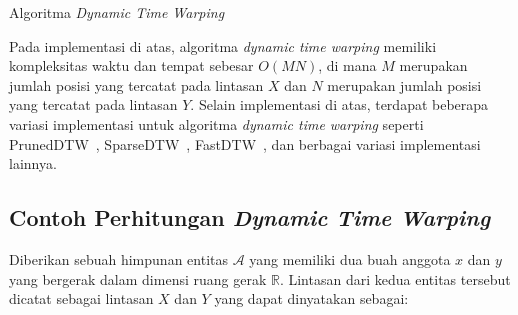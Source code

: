 \begin{algorithm}[h]
    \caption{Algoritma \textit{Dynamic Time Warping}}
    \DontPrintSemicolon
    
    \label{bab2:dtw-pseudocode}
 
  
    
\end{algorithm}

Pada implementasi di atas, algoritma \textit{dynamic time warping} memiliki kompleksitas waktu dan tempat sebesar $O(MN)$, di mana $M$ merupakan jumlah posisi yang tercatat pada lintasan $X$ dan $N$ merupakan jumlah posisi yang tercatat pada lintasan $Y$. Selain implementasi di atas, terdapat beberapa variasi implementasi untuk algoritma \textit{dynamic time warping} seperti PrunedDTW~\cite{diego:02:pruned-dtw}, SparseDTW~\cite{ghazi:02:sparse-dtw}, FastDTW~\cite{salvador:02:fast-dtw}, dan berbagai variasi implementasi lainnya.

\subsection{Contoh Perhitungan \textit{Dynamic Time Warping}}
\label{subsec:contoh-dtw}

Diberikan sebuah himpunan entitas $\mathcal{A}$ yang memiliki dua buah anggota $x$ dan $y$ yang bergerak dalam dimensi ruang gerak $\mathbb{R}$. Lintasan dari kedua entitas tersebut dicatat sebagai lintasan $X$ dan $Y$ yang dapat dinyatakan sebagai: 

